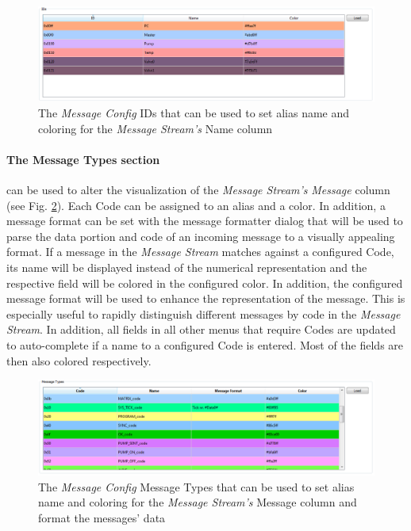 \documentclass[12pt,a4paper]{scrartcl}
\begin{document}
\begin{figure}
	\centering
	\includegraphics[width=\linewidth,keepaspectratio]{Graphics/MessageConfigIDs}
	\caption[Message Config IDs]{The \textit{Message Config} IDs that can be used to set alias name and coloring for the \textit{Message Stream's} Name column}
	\label{fig:MessageConfigIDs}
\end{figure}

\paragraph{The Message Types section} can be used to alter the visualization of the \textit{Message Stream's} \textit{Message} column (see Fig. \ref{fig:MessageConfigMessageTypes}). Each Code can be assigned to an alias and a color. In addition, a message format can be set with the message formatter dialog that will be used to parse the data portion and code of an incoming message to a visually appealing format. If a message in the \textit{Message Stream} matches against a configured Code, its name will be displayed instead of the numerical representation and the respective field will be colored in the configured color. In addition, the configured message format will be used to enhance the representation of the message. This is especially useful to rapidly distinguish different messages by code in the \textit{Message Stream}. In addition, all fields in all other menus that require Codes are updated to auto-complete if a name to a configured Code is entered. Most of the fields are then also colored respectively.

\begin{figure}
	\centering
	\includegraphics[width=\linewidth,keepaspectratio]{Graphics/MessageConfigMessageTypes}
	\caption[Message Config Message Types]{The \textit{Message Config} Message Types that can be used to set alias name and coloring for the \textit{Message Stream's} Message column and format the messages' data}
	\label{fig:MessageConfigMessageTypes}
\end{figure}
\end{document}
